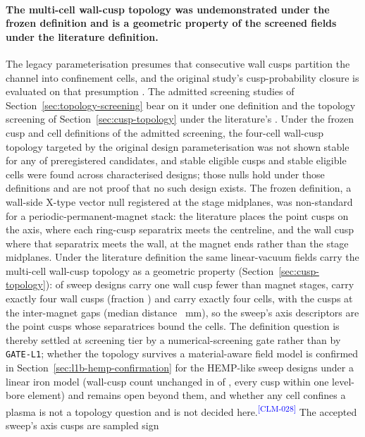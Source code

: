 \documentclass[11pt]{article}
\newcommand{\EvidenceClaim}[2]{#2\textsuperscript{\textcolor{blue}{[#1]}}}
\begin{document}
\paragraph{The multi-cell wall-cusp topology was undemonstrated under the
frozen definition and is a geometric property of the screened fields under the
literature definition.}
The legacy parameterisation presumes that consecutive wall cusps partition the
channel into confinement cells, and the original study's cusp-probability
closure is evaluated on that presumption \cite{Muffatti2017}. The admitted
screening studies of Section~\ref{sec:topology-screening} bear on it under one
definition and the topology screening of Section~\ref{sec:cusp-topology} under
the literature's \cite{Gildea2012,Lewerentz2023,Kornfeld2007}.
\EvidenceClaim{CLM-028}{Under the frozen cusp and cell definitions of the
admitted screening, the four-cell wall-cusp topology targeted by the original
design parameterisation was not shown stable for any of \FcnEvaluated{}
preregistered candidates, and \TchStableEligibleCusps{} stable eligible cusps
and \TchStableEligibleCells{} stable eligible cells were found across
\TchEvaluated{} characterised designs; those nulls hold under those definitions
and are not proof that no such design exists. The frozen definition, a
wall-side X-type vector null registered at the stage midplanes, was
non-standard for a periodic-permanent-magnet stack: the literature places the
point cusps on the axis, where each ring-cusp separatrix meets the centreline,
and the wall cusp where that separatrix meets the wall, at the magnet ends
rather than the stage midplanes. Under the literature definition the same
linear-vacuum fields carry the multi-cell wall-cusp topology as a geometric
property (Section~\ref{sec:cusp-topology}): \CtvSweepNMinusOne{} of
\CtvSweepCount{} sweep designs carry one wall cusp fewer than magnet stages,
\CtvSweepFourWallCusps{} carry exactly four wall cusps (fraction
\CtvSweepFourWallCuspFraction) and \CtvSweepFourCells{} carry exactly four cells,
with the cusps at the inter-magnet gaps (median distance
\CtvSweepGapMedianMm{}~mm), so the sweep's axis descriptors are the point cusps
whose separatrices bound the cells. The definition question is thereby settled
at screening tier by a numerical-screening gate rather than by
\texttt{GATE-L1}; whether the topology survives a material-aware field model is
confirmed in Section~\ref{sec:l1b-hemp-confirmation} for the \HmcDesignCount{}
HEMP-like sweep designs under a linear iron model (wall-cusp count unchanged in
\HmcGateBAgreeStrict{} of \HmcDesignCount, every cusp within one
level-\HmcLevelZeroToken{} bore element) and remains open beyond them, and
whether any cell confines a plasma is not a topology question
and is not decided here.} The accepted sweep's axis cusps are sampled sign
\end{document}
